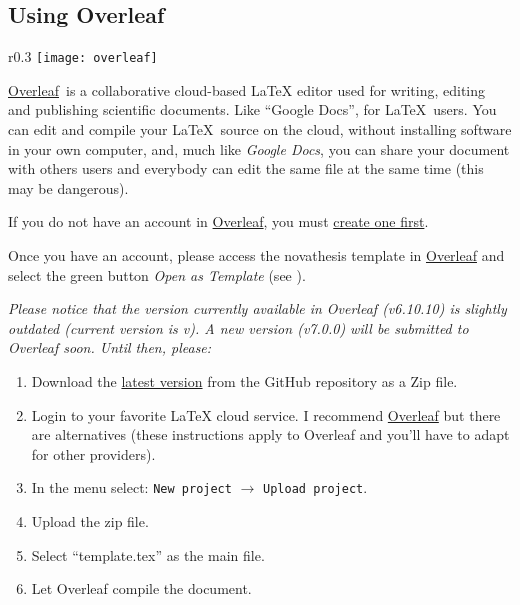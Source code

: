 \subsection{Using Overleaf}
\label{sub:using_overleaf}


\newcommand{\Overleaf}{\href{https://www.overleaf.com?r=f5160636&rm=d&rs=b}{Overleaf}}

\begin{wrapfigure}{r}{0.3\linewidth}
\texttt{[image: overleaf]}%
\caption{NOVAthesis template in Overleaf.}
\label{fig:overleaf}
\end{wrapfigure}
\mbox{}\Overleaf\ is a collaborative cloud-based LaTeX editor used for writing, editing and publishing scientific documents. Like “Google Docs”,  for \LaTeX\ users. You can edit and compile your \LaTeX\ source on the cloud, without installing software in your own computer, and, much like \emph{Google Docs}, you can share your document with others users and everybody can edit the same file at the same time (this may be dangerous).

If you do not have an account in \Overleaf, you must \href{https://www.overleaf.com?r=f5160636&rm=d&rs=b}{create one first}.

Once you have an account, please access the \gls{novathesis} template in \href{https://www.overleaf.com/latex/templates/novathesis-v6-dot-10-dot-10/jhqwhtcwbmqc}{Overleaf} and select the green button \emph{Open as Template} (see ).

\bgroup
  \itshape
  Please notice that the version currently available in Overleaf (v6.10.10) is slightly outdated (current version is v\novathesisversion). A new version (v7.0.0) will be submitted to Overleaf soon.  Until then, please:
  \begin{enumerate}
    \item Download the \href{https://github.com/joaomlourenco/novathesis/archive/main.zip}{latest version} from the GitHub repository as a Zip file.
    \item Login to your favorite LaTeX cloud service. I recommend \href{https://www.overleaf.com/?r=f5160636&rm=d&rs=b}{Overleaf} but there are alternatives (these instructions apply to Overleaf and you'll have to adapt for other providers).
    \item In the menu select: \texttt{New project} $\rightarrow$ \texttt{Upload project}.
    \item Upload the zip file.
    \item Select “template.tex” as the main file.
    \item Let Overleaf compile the document.
  \end{enumerate}
\egroup

